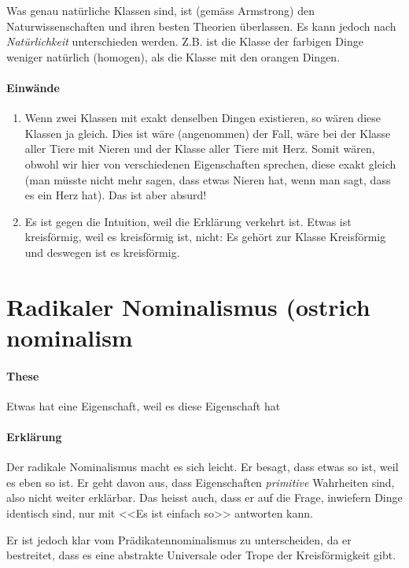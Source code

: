 \documentclass[../main.tex]{subfiles}
\begin{document}
Was genau natürliche Klassen sind, ist (gemäss Armstrong) den Naturwissenschaften und ihren besten Theorien überlassen. Es kann jedoch nach \textit{Natürlichkeit} unterschieden werden. Z.B. ist die Klasse der farbigen Dinge weniger natürlich (homogen), als die Klasse mit den orangen Dingen. 

\paragraph{Einwände}
\begin{enumerate}
	\item Wenn zwei Klassen mit exakt denselben Dingen existieren, so wären diese Klassen ja gleich. Dies ist wäre (angenommen) der Fall, wäre bei der Klasse aller Tiere mit Nieren und der Klasse aller Tiere mit Herz. Somit wären, obwohl wir hier von verschiedenen Eigenschaften sprechen, diese exakt gleich (man müsste nicht mehr sagen, dass etwas Nieren hat, wenn man sagt, dass es ein Herz hat). Das ist aber absurd!
	\item Es ist gegen die Intuition, weil die Erklärung verkehrt ist. Etwas ist kreisförmig, weil es kreisförmig ist, nicht: Es gehört zur Klasse Kreisförmig und deswegen ist es kreisförmig. 
\end{enumerate}

\section{Radikaler Nominalismus (ostrich nominalism}
\paragraph{These} Etwas hat eine Eigenschaft, weil es diese Eigenschaft hat
\paragraph{Erklärung} Der radikale Nominalismus macht es sich leicht. Er besagt, dass etwas so ist, weil es eben so ist. Er geht davon aus, dass Eigenschaften \textit{primitive} Wahrheiten sind, also nicht weiter erklärbar. Das heisst auch, dass er auf die Frage, inwiefern Dinge identisch sind, nur mit <<Es ist einfach so>> antworten kann. 

Er ist jedoch klar vom Prädikatennominalismus zu unterscheiden, da er bestreitet, dass es eine abstrakte Universale oder Trope der Kreisförmigkeit gibt. 
\end{document}
